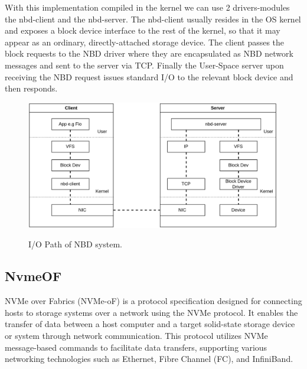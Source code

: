    With this implementation compiled in the kernel we can use 2 drivers-modules
  the nbd-client and the nbd-server. The nbd-client usually resides in the OS kernel
  and exposes a block device interface to the rest of the kernel, so that it may
  appear as an ordinary, directly-attached storage device. The client passes the
  block requests to the NBD driver where they are encapsulated as NBD network
  messages and sent to the server via TCP. Finally the User-Space server upon
  receiving the NBD request issues standard I/O to the relevant block device and
  then responds. 

  \begin{figure}[h]
    \includegraphics[scale=0.25]{figures/nbd-path2.png}\\
    \caption{I/O Path of NBD system.}
  \end{figure}

\vspace{1em}
\subsection{NvmeOF}
NVMe over Fabrics (NVMe-oF) is a protocol specification designed for connecting
hosts to storage systems over a network using the NVMe protocol. It enables the
transfer of data between a host computer and a target solid-state storage device
or system through network communication. This protocol utilizes NVMe
message-based commands to facilitate data transfers, supporting various
networking technologies such as Ethernet, Fibre Channel (FC), and InfiniBand.

\vspace{1em}
